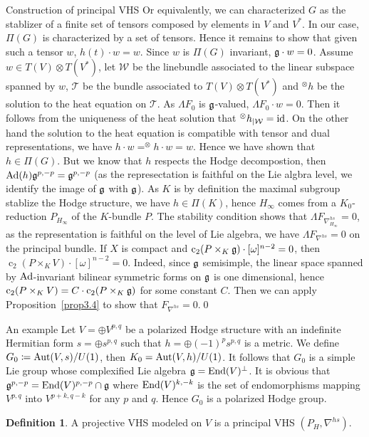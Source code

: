 \documentclass[aspectratio=169, 10pt]{beamer}
\theoremstyle{definition}
\newtheorem{Def}{Definition}
\theoremstyle{example}
\begin{document}
\begin{frame}[allowframebreaks]{Construction of principal VHS}
		Or equivalently, we can characterized $G$ as the stablizer of a finite set of tensors composed by elements in $V$ and $V^*$. In our case, $\Pi(G)$ is characterized by a set of tensors. Hence it remains to show that given such a tensor $w$, $h(t)\cdot w=w$. Since $w$ is $\Pi(G)$ invariant, $\mathfrak{g} \cdot w=0$. Assume $w\in T(V)\otimes T(V^*)$, let $\mathcal{W}$ be the linebundle associated to the linear subspace spanned by $w$, $\mathcal{T}$ be the bundle associated to $T(V)\otimes T(V^*)$ and $^{\otimes}h$ be the solution to the heat equation on $\mathcal{T}$. As $\Lambda F_0$ is $\mathfrak{g}$-valued, $\Lambda F_0\cdot w=0$. Then it follows from the uniqueness of the heat solution that $^{\otimes}h_{|\mathcal{W}}=\mathrm{id}$. On the other hand the solution to the heat equation is compatible with tensor and dual representations, we have $h\cdot w=^{\otimes}h\cdot w=w$. Hence we have shown that $h\in \Pi(G)$. But we know that $h$ respects the Hodge decompostion, then $\operatorname{Ad}(h)\mathfrak{g}^{p,-p}=\mathfrak{g}^{p,-p}$ (as the represectation is faithful on the Lie algbra level, we identify the image of $\mathfrak{g}$ with $\mathfrak{g}$). As $K$ is by definition the maximal subgroup stablize the Hodge structure, we have $h\in \Pi(K)$, hence $H_\infty$ comes from a $K_0$-reduction $P_{H_\infty}$ of the $K$-bundle $P$. The stability condition shows that $\Lambda F_{\nabla^{hs}_{H_{\infty}}}=0$, as the representation is faithful on the level of Lie algebra, we have $\Lambda F_{\nabla^{hs}}=0$ on the principal bundle. If $X$ is compact and $\operatorname{c}_2(P\times_K \mathfrak{g})\cdot [\omega]^{n-2}=0$, then $\operatorname{c}_2(P\times_K V)\cdot [\omega]^{n-2}=0$. Indeed, since $\mathfrak{g}$ semisimple, the linear space spanned by $\operatorname{Ad}$-invariant bilinear symmetric forms on $\mathfrak{g}$ is one dimensional, hence $\operatorname{c}_2(P\times_K V)=C\cdot\operatorname{c}_2(P\times_K \mathfrak{g})$ for some constant $C$. Then we can apply Proposition~\ref{prop3.4} to show that $F_{\nabla^{hs}}=0$.\hfill \qed
	\end{frame}
	\begin{frame}{An example}
		Let $V=\oplus V^{p,q}$ be a polarized Hodge structure with an indefinite Hermitian form ${s}=\oplus s^{p,q}$ such that $h=\oplus (-1)^p s^{p,q}$ is a metric. We define $G_0\coloneqq\operatorname{Aut}(V,s)/U(1)$, then $K_0=\operatorname{Aut}(V,h)/U(1)$. It follows that $G_0$ is a simple Lie group whose complexified Lie algebra $\mathfrak{g}=\operatorname{End}(V)^{\perp}$. It is obvious that $\mathfrak{g}^{p,-p}=\operatorname{End}(V)^{p,-p}\cap \mathfrak{g}$ where $\operatorname{End}(V)^{k,-k}$ is the set of endomorphisms mapping $V^{p,q}$ into $V^{p+k,q-k}$  for any $p$ and $q$. Hence $G_0$ is a polarized Hodge group. 
		\begin{Def}
			A projective VHS modeled on $V$ is a principal VHS $(P_H,\nabla^{hs})$.
		\end{Def}
	\end{frame}
\end{document}
